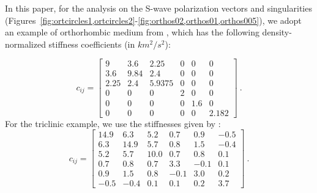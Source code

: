 In this paper, for the analysis on the S-wave polarization vectors and singularities (Figures~\ref{fig:ortcircles1,ortcircles2}-\ref{fig:orthos02,orthos01,orthos005}), we adopt an example of orthorhombic medium from \cite{helbig}, which has the following density-normalized stiffness coefficients (in $km^2/s^2$):

  \begin{equation}
\label{eq:orth}
c_{ij} =
\begin{bmatrix}
  9    & 3.6  & 2.25   & 0 & 0   & 0 \\
  3.6  & 9.84 & 2.4    & 0 & 0   & 0 \\
  2.25 & 2.4  & 5.9375 & 0 & 0   & 0 \\
  0    & 0    & 0      & 2 & 0   & 0 \\
  0    & 0    & 0      & 0 & 1.6 & 0 \\
  0    & 0    & 0      & 0 & 0   & 2.182
\end{bmatrix}~.
\end{equation}
For the triclinic example, we use the stiffnesses given by \cite{mah2003}:
 \begin{equation}
\label{eq:tric}
c_{ij} =
\begin{bmatrix}
  14.9 & 6.3  & 5.2  & 0.7  & 0.9  & -0.5 \\
  6.3  & 14.9 & 5.7  & 0.8  & 1.5  & -0.4 \\
  5.2  & 5.7  & 10.0 & 0.7  & 0.8  & 0.1  \\
  0.7  & 0.8  & 0.7  & 3.3  & -0.1 & 0.1  \\
  0.9  & 1.5  & 0.8  & -0.1 & 3.0  & 0.2  \\
  -0.5 & -0.4 & 0.1  & 0.1  & 0.2  & 3.7
\end{bmatrix}~.
\end{equation}



